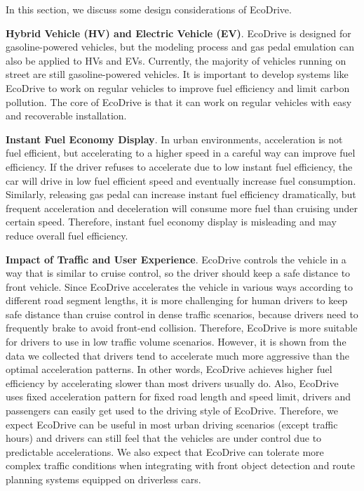 
In this section, we discuss some design considerations of EcoDrive. 


\textbf{Hybrid Vehicle (HV) and Electric Vehicle (EV)}. 
EcoDrive is designed for gasoline-powered vehicles, but the modeling process
and gas pedal emulation can also be applied to HVs and EVs. 
Currently, the majority of vehicles running
on street are still gasoline-powered vehicles. 
It is important to develop systems like EcoDrive
to work on regular vehicles to improve fuel efficiency
and limit carbon pollution. 
The core of EcoDrive is that it can work on regular vehicles
with easy and recoverable installation. 


\textbf{Instant Fuel Economy Display}.
In urban environments, acceleration is not fuel efficient, but accelerating to a higher speed
in a careful way can improve fuel efficiency. 
If the driver refuses to accelerate due to low instant fuel efficiency,
the car will drive in low fuel efficient speed and eventually increase
fuel consumption. 
Similarly, releasing gas pedal can increase instant fuel efficiency dramatically, 
but frequent acceleration and deceleration will consume more fuel
than cruising under certain speed. 
Therefore, instant fuel economy display is misleading
and may reduce overall fuel efficiency. 



\textbf{Impact of Traffic and User Experience}.
EcoDrive controls the vehicle in a way that is similar to cruise control, 
so the driver should keep a safe distance to
front vehicle. 
Since EcoDrive accelerates the vehicle in various ways according to
different road segment lengths, 
it is more challenging for human drivers to keep safe distance than cruise
control in dense traffic scenarios, because
drivers need to frequently brake to avoid front-end collision. 
Therefore, EcoDrive is more suitable for drivers to use in low traffic volume scenarios. 
However, it is shown from the data we collected that drivers tend to
accelerate much more aggressive than the optimal acceleration patterns. 
In other words, EcoDrive achieves higher fuel efficiency by accelerating
slower than most drivers usually do. 
Also, EcoDrive uses fixed acceleration pattern for fixed road length
and speed limit, 
drivers and passengers can easily get used to the driving style
of EcoDrive. 
Therefore, we expect EcoDrive can be useful in most urban driving scenarios 
(except traffic hours) and drivers can still feel that the vehicles are under control
due to predictable accelerations. 
We also expect that EcoDrive can tolerate more complex traffic
conditions when integrating with front object detection and
route planning systems equipped on driverless cars. 


